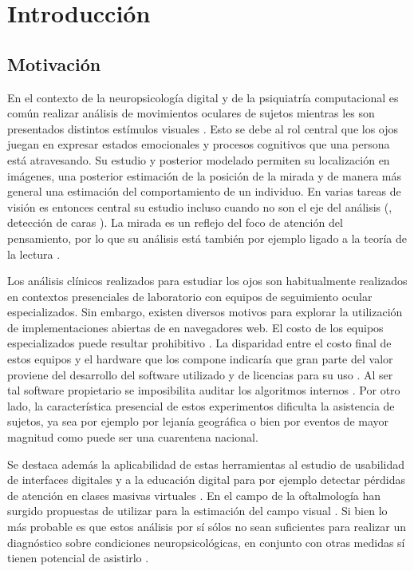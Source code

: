 \chapter{Introducción}

\section{Motivación}

En el contexto de la neuropsicología digital y de la psiquiatría computacional
es común realizar análisis de movimientos oculares de sujetos mientras les son
presentados distintos estímulos visuales \cite{munoz_2004_look_away,
clifton_2016_eye_movements_in_reading}.
Esto se debe al rol central que los ojos juegan en expresar estados emocionales
y procesos cognitivos que una persona está atravesando.
Su estudio y posterior modelado permiten su localización en imágenes, una
posterior estimación de la posición de la mirada y de manera más general una
estimación del comportamiento de un individuo.
En varias tareas de visión es entonces central su estudio incluso cuando no son
el eje del análisis (\eg, detección de caras
\cite{hansen_2009_eye_of_the_beholder}).
La mirada es un reflejo del foco de atención del pensamiento, por lo que su
análisis está también por ejemplo ligado a la teoría de la lectura
\cite{just_1980_theory_of_reading}.

Los análisis clínicos realizados para estudiar los ojos son habitualmente
realizados en contextos presenciales de laboratorio con equipos de seguimiento
ocular especializados.
Sin embargo, existen diversos motivos para explorar la utilización de
implementaciones abiertas de \eyetrackers en navegadores web.
El costo de los equipos especializados puede resultar prohibitivo
\cite{zandi_2021_pupilext}.
La disparidad entre el costo final de estos equipos y el hardware que los
compone indicaría que gran parte del valor proviene del desarrollo del software
utilizado y de licencias para su uso \cite{zandi_2021_pupilext,
xu_2015_turker_gaze}.
Al ser tal software propietario se imposibilita auditar los algoritmos internos
\cite{zandi_2021_pupilext}.
Por otro lado, la característica presencial de estos experimentos dificulta la
asistencia de sujetos, ya sea por ejemplo por lejanía geográfica o bien por
eventos de mayor magnitud como puede ser una cuarentena nacional.

Se destaca además la aplicabilidad de estas herramientas al estudio de
usabilidad de interfaces digitales \cite{papoutsaki_2017_search_gazer} y a la
educación digital para por ejemplo detectar pérdidas de atención en clases
masivas virtuales \cite{zhao_2017_mind_wandering}.
En el campo de la oftalmología han surgido propuestas de utilizar \eyetracking
para la estimación del campo visual
\cite{leitner_2021_eyetracking_based_visual_field,
murray_2009_children_perimetry_using_eye_tracking}.
Si bien lo más probable es que estos análisis por sí sólos no sean suficientes
para realizar un diagnóstico sobre condiciones neuropsicológicas, en conjunto
con otras medidas sí tienen potencial de asistirlo
\cite{clark_2019_eye_tracking_potential_in_ophtalmology}.


